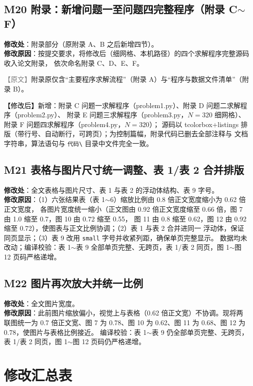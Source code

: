 \documentclass[UTF8,zihao=-4]{ctexart}
\newcommand{\yuanduan}[1]{\par\noindent\textcolor{gray}{\small 【原文】}#1\par}
\newcommand{\xinduan}[1]{\par\noindent\textcolor{black}{\small 【修改后】}#1\par}
\begin{document}
\subsection*{M20 附录：新增问题一至问题四完整程序（附录 C$\sim$F）}

\textbf{修改处}：附录部分（原附录 A、B 之后新增四节）。\\
\textbf{修改原因}：按提交要求，将修改后（细网格、本机路径）的四个求解程序完整源码收入论文附录，
依次命名附录 C、D、E、F。

\yuanduan{附录原仅含“主要程序求解流程”（附录 A）与“程序与数据文件清单”（附录 B）。}
\xinduan{新增：附录 C 问题一求解程序（problem1.py）、附录 D 问题二求解程序（problem2.py）、
附录 E 问题三求解程序（problem3.py，$N=320$ 细网格）、附录 F 问题四求解程序（problem4.py，$N=320$）；
源码以 tcolorbox+listings 排版（带行号、自动断行，可跨页）；为控制篇幅，附录代码已删去全部注释与
文档字符串，算法语句与 \texttt{代码\textbackslash} 目录中文件完全一致。}

\subsection*{M21 表格与图片尺寸统一调整、表 1/表 2 合并排版}

\textbf{修改处}：全文表格与图片尺寸、表 1 与表 2 的浮动体结构、表 9 字号。\\
\textbf{修改原因}：（1）六张结果表（表 1$\sim$6）缩放比例由 0.8 倍正文宽度缩小为 0.62 倍正文宽度，
各图片宽度统一缩小（正文图由 0.92 倍正文宽度缩至 0.66 倍，图 7 由 1.0 缩至 0.7，图 10 由 0.72 缩至 0.55，
图 11 由 0.8 缩至 0.62，图 12 由 0.92 缩至 0.72），使图表与正文比例协调；（2）表 1 与表 2 合并进同一
浮动体，保证同页显示；（3）表 9 改用 \texttt{small} 字号并收紧列距，确保单页完整显示。
数据均未改动；编译校验：表 1$\sim$表 9 全部单页完整、无跨页，表 1/表 2 同页，图 1$\sim$图 12
页码严格递增。

\subsection*{M22 图片再次放大并统一比例}

\textbf{修改处}：全文图片宽度。\\
\textbf{修改原因}：此前图片缩放偏小，视觉上与表格（0.62 倍正文宽）不协调。现将两联图统一为
0.7 倍正文宽、图 7 为 0.78、图 10 为 0.62、图 11 为 0.68、图 12 为 0.78，使图片与表格比例接近。
编译校验：表 1$\sim$表 9 仍全部单页完整、无跨页，表 1/表 2 同页，图 1$\sim$图 12 页码仍严格递增。

\section{修改汇总表}
\end{document}
